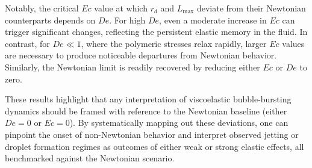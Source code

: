 \documentclass{jfm}
\newcommand{\bb}{\color{black} \normalfont}
\begin{document}
Notably, the critical $Ec$ value at which $r_d$ and $L_{\text{max}}$ deviate from their Newtonian counterparts depends on $De$. For high $De$, even a moderate increase in $Ec$ can trigger significant changes, reflecting the persistent elastic memory in the fluid. In contrast, for $De \ll 1$, where the polymeric stresses relax rapidly, larger $Ec$ values are necessary to produce noticeable departures from Newtonian behavior. Similarly, the Newtonian limit is readily recovered by reducing either $Ec$ or $De$ to zero.

These results highlight that any interpretation of viscoelastic bubble-bursting dynamics should be framed with reference to the Newtonian baseline (either $De = 0$ or $Ec = 0$). By systematically mapping out these deviations, one can pinpoint the onset of non-Newtonian behavior and interpret observed jetting or droplet formation regimes as outcomes of either weak or strong elastic effects, all benchmarked against the Newtonian scenario.

\bb



\end{document}
